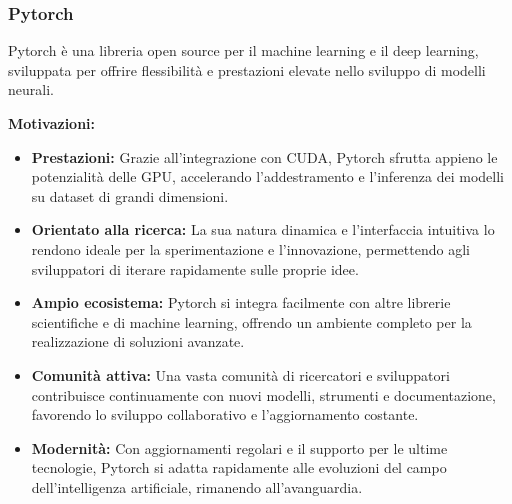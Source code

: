 \subsubsection{Pytorch}
\label{subsubsec:pytorch}

Pytorch è una libreria open source per il machine learning e il deep learning, sviluppata per offrire flessibilità e prestazioni elevate nello sviluppo di modelli neurali.

\textbf{Motivazioni:}
\begin{itemize}
    \item \textbf{Prestazioni:} Grazie all'integrazione con CUDA, Pytorch sfrutta appieno le potenzialità delle GPU, accelerando l'addestramento e l'inferenza dei modelli su dataset di grandi dimensioni.
    \item \textbf{Orientato alla ricerca:} La sua natura dinamica e l'interfaccia intuitiva lo rendono ideale per la sperimentazione e l'innovazione, permettendo agli sviluppatori di iterare rapidamente sulle proprie idee.
    \item \textbf{Ampio ecosistema:} Pytorch si integra facilmente con altre librerie scientifiche e di machine learning, offrendo un ambiente completo per la realizzazione di soluzioni avanzate.
    \item \textbf{Comunità attiva:} Una vasta comunità di ricercatori e sviluppatori contribuisce continuamente con nuovi modelli, strumenti e documentazione, favorendo lo sviluppo collaborativo e l'aggiornamento costante.
    \item \textbf{Modernità:} Con aggiornamenti regolari e il supporto per le ultime tecnologie, Pytorch si adatta rapidamente alle evoluzioni del campo dell'intelligenza artificiale, rimanendo all'avanguardia.
\end{itemize}

